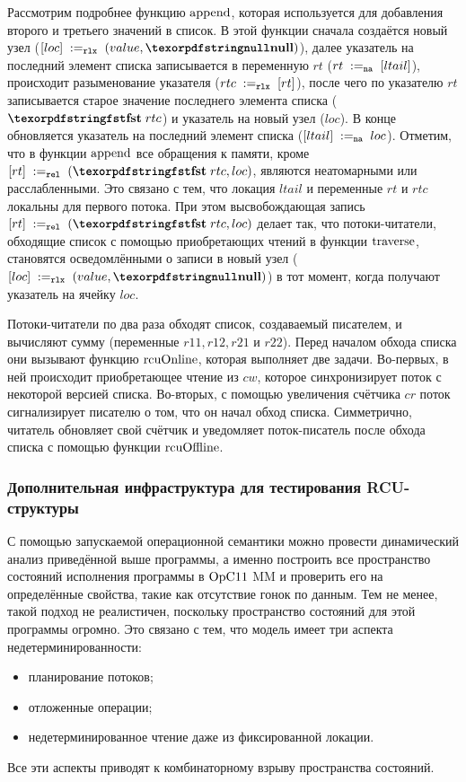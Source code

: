 Рассмотрим подробнее функцию ${\rm append}$, которая используется для добавления второго и третьего значений в список.
В этой функции сначала создаётся новый узел ($\writeInstParam{\rlx}{loc}{(value, \nullPtr)}$),
далее указатель на последний элемент списка записывается в переменную $rt$ ($rt \;:=_{\mathtt{na}}\;[ltail]$),
происходит разыменование указателя ($rtc \;:=_{\mathtt{rlx}}\;[rt]$),
после чего по указателю $rt$ записывается старое значение последнего элемента списка ($\kw{fst} \; rtc$)
и указатель на новый узел ($loc$).
В конце обновляется указатель на последний элемент списка ($[ltail] \;:=_{\mathtt{na}}\;loc$).
Отметим, что в функции ${\rm append}$ все обращения к памяти, кроме $\writeInstParam{\rel}{rt}{(\kw{fst} \; rtc, loc)}$,
являются неатомарными или расслабленными. Это связано с тем, что локация $ltail$ и переменные $rt$ и $rtc$ локальны
для первого потока. При этом высвобождающая запись $\writeInstParam{\rel}{rt}{(\kw{fst} \; rtc, loc)}$
делает так, что потоки-читатели, обходящие список с помощью приобретающих чтений в функции ${\rm traverse}$,
становятся осведомлёнными о записи в новый узел ($\writeInstParam{\rlx}{loc}{(value, \nullPtr)}$) в тот момент,
когда получают указатель на ячейку $loc$.

Потоки-читатели по два раза обходят список, создаваемый писателем, и вычисляют сумму (переменные $r11, r12, r21$ и $r22$).
Перед началом обхода списка они вызывают функцию ${\rm rcuOnline}$,
которая выполняет две задачи. Во-первых, в ней происходит приобретающее чтение из $cw$, которое синхронизирует
поток с некоторой версией списка. Во-вторых, с помощью увеличения счётчика $cr$ поток сигнализирует писателю о том,
что он начал обход списка.
Симметрично, читатель обновляет свой счётчик и уведомляет поток-писатель после обхода списка с помощью функции ${\rm rcuOffline}$.

\subsubsection{Дополнительная инфраструктура для тестирования RCU-структуры}
С помощью запускаемой операционной семантики можно провести динамический анализ приведённой выше программы,
а именно построить все пространство состояний исполнения программы в $\mathrm{OpC11}$ MM и проверить его на
определённые свойства, такие как отсутствие гонок по данным.
Тем не менее, такой подход не реалистичен, поскольку пространство состояний для этой программы огромно.
Это связано с тем, что модель имеет три аспекта недетерминированности:
\begin{itemize}
  \item планирование потоков;
  \item отложенные операции;
  \item недетерминированное чтение даже из фиксированной локации.
\end{itemize}
Все эти аспекты приводят к комбинаторному взрыву пространства состояний.

